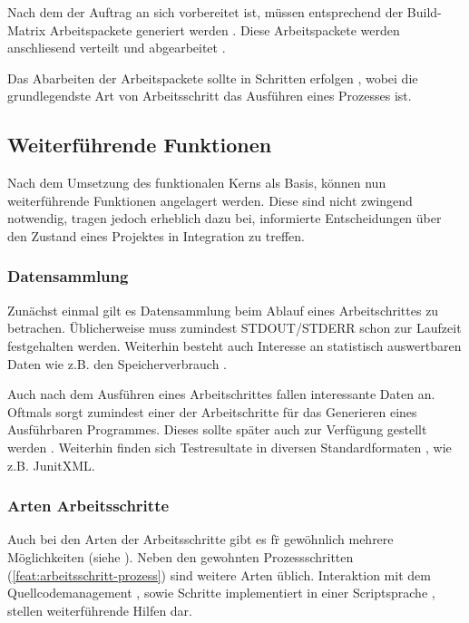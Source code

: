 Nach dem der Auftrag an sich vorbereitet ist, m\"ussen entsprechend der Build-Matrix 
Arbeitspackete generiert werden .
Diese Arbeitspackete werden anschliesend verteilt  und abgearbeitet .

Das Abarbeiten der Arbeitspackete sollte in Schritten erfolgen ,
wobei die grundlegendste Art von Arbeitsschritt das Ausf\"uhren eines Prozesses  ist.


\subsection{Weiterf\"uhrende Funktionen}

Nach dem Umsetzung des funktionalen Kerns als Basis,
k\"onnen nun weiterf\"uhrende Funktionen angelagert werden.
Diese sind nicht zwingend notwendig, tragen jedoch erheblich dazu bei,
informierte Entscheidungen \"uber den Zustand eines Projektes in Integration zu treffen.

\subsubsection{Datensammlung}

Zun\"achst einmal gilt es Datensammlung beim Ablauf eines Arbeitschrittes zu betrachen.
\"Ublicherweise muss zumindest STDOUT/STDERR schon zur Laufzeit festgehalten  werden.
Weiterhin besteht auch Interesse an statistisch auswertbaren Daten
wie z.B. den Speicherverbrauch .

Auch nach dem Ausf\"uhren eines Arbeitschrittes fallen interessante Daten an.
Oftmals sorgt zumindest einer der Arbeitschritte f\"ur das Generieren eines Ausf\"uhrbaren Programmes.
Dieses sollte sp\"ater auch zur Verf\"ugung gestellt werden .
Weiterhin finden sich Testresultate in diversen Standardformaten ,
wie z.B. JunitXML.

\subsubsection{Arten Arbeitsschritte}

Auch bei den Arten der Arbeitsschritte gibt es f\"r gew\"ohnlich mehrere M\"oglichkeiten (siehe ).
Neben den gewohnten Prozessschritten (\cref{feat:arbeitsschritt-prozess}) sind weitere Arten \"ublich.
Interaktion mit dem Quellcodemanagement , sowie
Schritte implementiert in einer Scriptsprache ,
stellen weiterf\"uhrende Hilfen dar.

